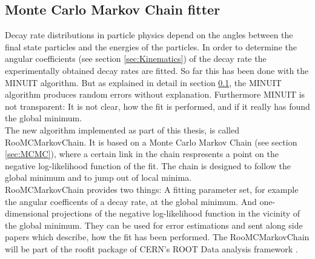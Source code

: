 \documentclass[english]{uzhpub}
\begin{document}
\subsection{Monte Carlo Markov Chain fitter} \label{sec:RooMCMC}

Decay rate distributions in particle physics depend on the angles between the final state particles and the energies of the particles. In order to determine the angular coefficients (see section \ref{sec:Kinematics}) of the decay rate the experimentally obtained decay rates are fitted.
So far this has been done with the MINUIT \cite{bib:Minuit} algorithm. But as explained in detail in section \ref{sec:RooMCMC}, the MINUIT algorithm produces random errors without explanation. Furthermore MINUIT is not transparent: It is not clear, how the fit is performed, and if it really has found the global minimum. \\
The new algorithm implemented as part of this thesis, is called RooMCMarkovChain. It is based on a Monte Carlo Markov Chain (see section \ref{sec:MCMC}), where a certain link in the chain respresents a point on the negative log-likelihood function of the fit. The chain is designed to follow the global minimum and to jump out of local minima. \\
RooMCMarkovChain provides two things: A fitting parameter set, for example the angular coefficents of a decay rate, at the global minimum. And one-dimensional projections of the  negative log-likelihood function in the vicinity of the global minimum. They can be used for error estimations and sent along side papers which describe, how the fit has been performed.
The RooMCMarkovChain will be part of the roofit package of CERN's ROOT Data analysis framework \cite{bib:root}.

%
\end{document}
